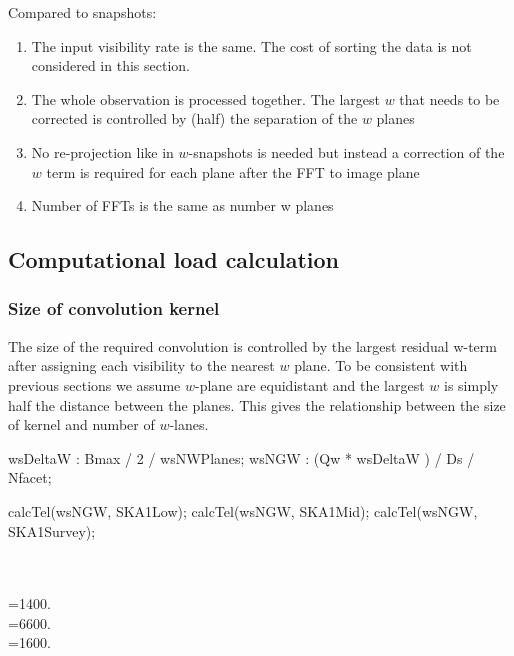 \documentclass[useAMS,usenatbib,referee]{article}
\begin{document}
Compared to snapshots:
\begin{enumerate}
  \item The input visibility rate is the same. The cost of sorting the
    data is not considered in this section.
  \item The whole observation is processed together. The largest $w$
    that needs to be corrected is controlled by (half) the separation
    of the $w$ planes
  \item No re-projection like in $w$-snapshots is needed but instead a
    correction of the $w$ term is required for each plane after the
    FFT to image plane
  \item Number of FFTs is the same as number w planes
\end{enumerate}

\subsection{Computational load calculation}


\subsubsection{Size of convolution kernel}

The size of the required convolution is controlled by the largest
residual w-term after assigning each visibility to the nearest $w$
plane. To be consistent with previous sections we assume $w$-plane are
equidistant and the largest $w$ is simply half the distance between
the planes.  This gives the relationship between the size of kernel
and number of $w$-lanes.

\begin{maxima}[]
wsDeltaW : Bmax / 2 / wsNWPlanes;
wsNGW :  (Qw * wsDeltaW ) / Ds / Nfacet;

calcTel(wsNGW, SKA1Low);
calcTel(wsNGW, SKA1Mid);
calcTel(wsNGW, SKA1Survey);

\maximaoutput*
{} \\
 \\
\m  {}={{1400.}} \\
\m  {}={{6600.}} \\
\m  {}={{1600.}} \\
\end{maxima}
\end{document}
